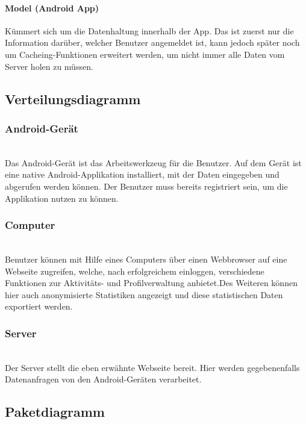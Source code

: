 \paragraph{Model (Android App)} Kümmert sich um die Datenhaltung innerhalb der App. Das ist zuerst nur die Information darüber, welcher Benutzer angemeldet ist, kann jedoch später noch um Cacheing-Funktionen erweitert werden, um nicht immer alle Daten vom Server holen zu müssen.

\subsection{Verteilungsdiagramm}

\subsubsection{Android-Gerät}\\
Das Android-Gerät ist das Arbeitswerkzeug für die Benutzer. Auf dem Gerät ist eine native Android-Applikation installiert, mit der Daten eingegeben und abgerufen werden können. Der Benutzer muss bereits registriert sein, um die Applikation nutzen zu können.\\
\subsubsection{Computer}\\
Benutzer können mit Hilfe eines Computers über einen Webbrowser auf eine Webseite zugreifen, welche, nach erfolgreichem einloggen, verschiedene Funktionen zur Aktivitäts- und Profilverwaltung anbietet.Des Weiteren können hier auch anonymisierte Statistiken angezeigt und diese statistischen Daten exportiert werden.\\
\subsubsection{Server}\\
Der Server stellt die eben erwähnte Webseite bereit. Hier werden gegebenenfalls Datenanfragen von den Android-Geräten verarbeitet.\\
\subsection{Paketdiagramm}